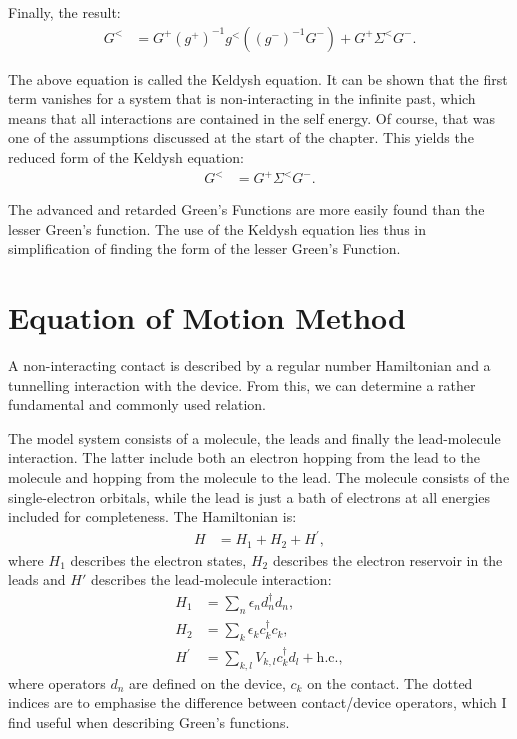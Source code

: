 Finally, the result:
\begin{align}
G^< &= G^+ (g^+)^{-1} g^< \left((g^-)^{-1}G^-  \right) + G^+  \Sigma^< G^-. \label{eq:keldysh}
\end{align}

The above equation is called the Keldysh equation. It can be shown that the first term vanishes for a system that is non\hyp{}interacting in the infinite past, which means that all interactions are contained in the self energy. Of course, that was one of the assumptions discussed at the start of the chapter. This yields the reduced form of the Keldysh equation:
\begin{align*}
G^< &=  G^+ \Sigma^< G^-.
\end{align*}

The advanced and retarded Green's Functions are more easily found than the lesser Green's function. The use of the Keldysh equation lies thus in simplification of finding the form of the lesser Green's Function.

\section{Equation of Motion Method}
\label{sec:eommethod}
A non\hyp{}interacting contact is described by a regular number Hamiltonian and a tunnelling interaction with the device. From this, we can determine a rather fundamental and commonly used relation. 

The model system consists of a molecule, the leads and finally the lead-molecule interaction. The latter include both an electron hopping from the lead to the molecule and hopping from the molecule to the lead. The molecule consists of the single-electron orbitals, while the lead is just a bath of electrons at all energies included for completeness. The Hamiltonian is:
\begin{align}
H &= H_1 + H_2 + H^\prime, \label{eq:hamiltonian}
\end{align} 
where $H_1$ describes the electron states, $H_2$ describes the electron reservoir in the leads and $H'$ describes the lead-molecule interaction:
\begin{align*}
H_1 &= \sum_n \epsilon_n d^\dagger_n d_n ,\\
H_2 &= \sum_{k} \epsilon_k c^\dagger_{k} c_{k} ,\\
H^\prime &= \sum_{k, l} V_{k, l} c^\dagger_{k} d_l + \text{h.c.},
\end{align*} where operators $d_n$ are defined on the device, $c_{k}$ on the contact. The dotted indices are to emphasise the difference between contact/device operators, which I find useful when describing Green's functions. 


